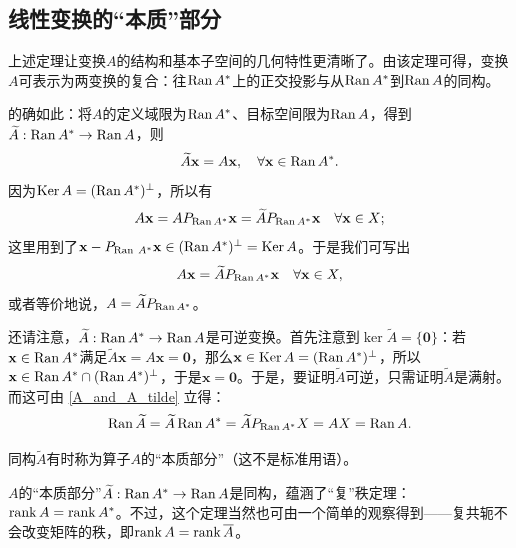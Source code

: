 \subsection{线性变换的“本质”部分}

上述定理让变换$A$的结构和基本子空间的几何特性更清晰了。由该定理可得，变换$A$可表示为两变换的复合：往$\operatorname{Ran} A^*$上的正交投影与从$\operatorname{Ran} A^*$到$\operatorname{Ran} A$的同构。

的确如此：将$A$的定义域限为$\operatorname{Ran} A^*$、目标空间限为$\operatorname{Ran} A$，得到$\widetilde{A}:\operatorname{Ran} A^*\to \operatorname{Ran} A$，则
\[\widetilde{A}\mathbf{x}=A\mathbf{x},\quad\forall\mathbf{x}\in\operatorname{Ran} A^{*}.\]
因为$\operatorname{Ker} A=(\operatorname{Ran} A^*)^\perp$，所以有\[A\mathbf{x}=AP_{\operatorname{Ran} A^*}\mathbf{x}=\widetilde{A}P_{\operatorname{Ran} A^*}\mathbf{x}\quad\forall\mathbf{x}\in X;\]
这里用到了$\mathbf{x}-P_{\mathrm{Ran~}A^{*}}\mathbf{x}\in(\operatorname{Ran} A^{*})^{\perp}=\operatorname{Ker} A$。于是我们可写出
\begin{equation}\label{A_and_A_tilde}
    A\mathbf{x}=\widetilde{A}P_{\operatorname{Ran} A^{*}}\mathbf{x}\quad\forall\mathbf{x}\in X,
\end{equation}
或者等价地说，$A=\widetilde{A}P_{\operatorname{Ran} A^{*}}$。

还请注意，$\widetilde{A}:\operatorname{Ran} A^{*}\to\operatorname{Ran} A$是可逆变换。首先注意到$\ker \widetilde{A}=\{\mathbf{0}\}$：若$\mathbf{x}\in\operatorname{Ran} A^*$满足$\widetilde{A}\mathbf{x}=A\mathbf{x}=\mathbf{0}$，那么$\mathbf{x}\in\operatorname{Ker} A=(\operatorname{Ran} A^*)^\perp$，所以$\mathbf{x}\in\operatorname{Ran} A^{*}\cap(\operatorname{Ran} A^{*})^{\perp}$，于是$\mathbf{x}=\mathbf{0}$。于是，要证明$\widetilde{A}$可逆，只需证明$\widetilde{A}$是满射。
而这可由 \eqref{A_and_A_tilde} 立得：
\[\operatorname{Ran} \widetilde{A}=\widetilde{A}\operatorname{Ran} A^*=\widetilde{A}P_{\operatorname{Ran} A^*}X=AX=\operatorname{Ran} A.\]

同构$\widetilde{A}$有时称为算子$A$的“本质部分”（这不是标准用语）。

$A$的“本质部分”$\widetilde{A}:\operatorname{Ran} A^{*}\to\operatorname{Ran} A$是同构，蕴涵了“复”秩定理：$\operatorname{rank} A=\operatorname{rank} A^*$。不过，这个定理当然也可由一个简单的观察得到——复共轭不会改变矩阵的秩，即$\operatorname{rank} A=\operatorname{rank} \overline{A}$。

